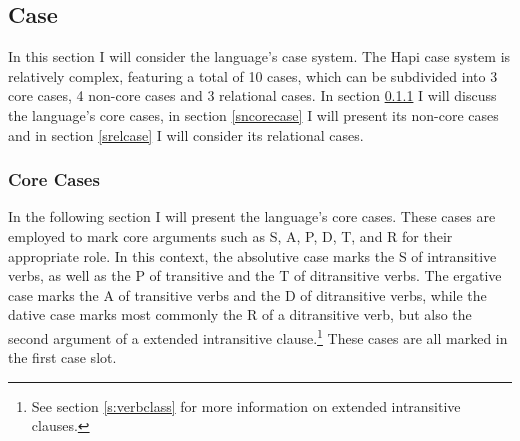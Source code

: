 \documentclass[a4paper, 12pt, oneside]{memoir}
\begin{document}
\subsection{Case}\label{scase}
In this section I will consider the language's case system. The Hapi case system is relatively complex, featuring a total of 10 cases, which can be subdivided into 3 core cases, 4 non-core cases and 3 relational cases. In section \ref{scorecase} I will discuss the language's core cases, in section \ref{sncorecase} I will present its non-core cases and in section \ref{srelcase} I will consider its relational cases. 
\subsubsection{Core Cases}\label{scorecase}
In the following section I will present the language's core cases. These cases are employed to mark core arguments such as S, A, P, D, T, and R for their appropriate role. In this context, the absolutive case marks the S of intransitive verbs, as well as the P of transitive and the T of ditransitive verbs. The ergative case marks the A of transitive verbs and the D of ditransitive verbs, while the dative case marks most commonly the R of a ditransitive verb, but also the second argument of a extended intransitive clause.\footnote{See section \ref{s:verbclass} for more information on extended intransitive clauses.} These cases are all marked in the first case slot.
\end{document}
